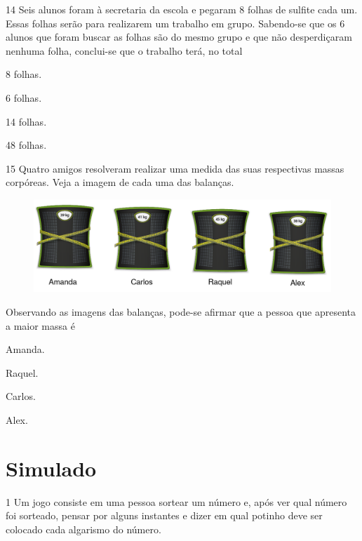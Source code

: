 \num{14} Seis alunos foram à secretaria da escola e pegaram 8 folhas de sulfite cada um. Essas folhas serão para realizarem um trabalho em grupo. Sabendo-se que os 6 alunos que foram buscar as folhas são do mesmo grupo
e que não desperdiçaram nenhuma folha, conclui-se que o trabalho terá, no total

\begin{multicols}{2}
\begin{escolha}
\item
  8 folhas.
\item
  6 folhas.
\item
  14 folhas.
\item
  48 folhas.
\end{escolha}
\end{multicols}

\num{15} Quatro amigos resolveram realizar uma medida das suas respectivas massas corpóreas. Veja a imagem de cada uma das balanças.

\begin{figure}[htpb!]
\centering
\includegraphics[width=.8\textwidth]{./media/image113.png}
\end{figure}

Observando as imagens das balanças, pode-se afirmar que a pessoa que apresenta a maior massa é

\begin{escolha}
\item
  Amanda.
\item
  Raquel.
\item
  Carlos.
\item
  Alex.
\end{escolha}

\chapter[Simulado 4]{Simulado}


\num{1} Um jogo consiste em uma pessoa sortear um número e, após ver qual número foi sorteado, pensar por alguns instantes e dizer em qual potinho deve ser colocado cada algarismo do número.


